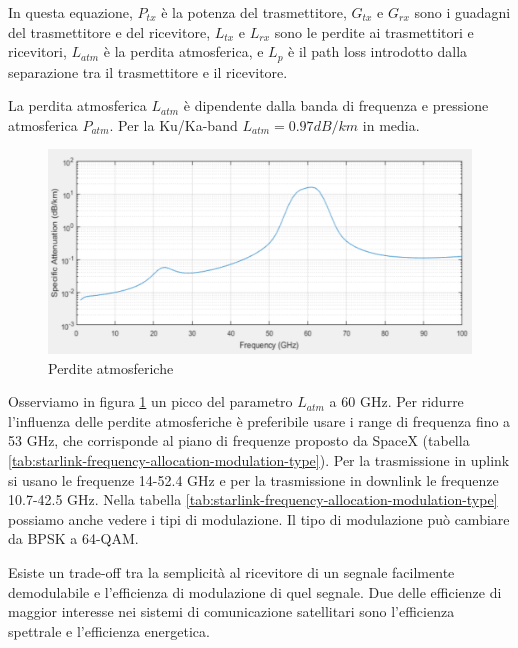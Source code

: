 In questa equazione, $P_{tx}$ è la potenza del trasmettitore, $G_{tx}$ e $G_{rx}$ sono i guadagni del trasmettitore e del ricevitore, $L_{tx}$ e $L_{rx}$ sono le perdite ai trasmettitori e ricevitori, $L_{atm}$ è la perdita atmosferica, e $L_{p}$ è il path loss introdotto dalla separazione tra il trasmettitore e il ricevitore.

La perdita atmosferica $L_{atm}$ è dipendente dalla banda di frequenza e pressione atmosferica $P_{atm}$.
Per la Ku/Ka-band $L_{atm} = 0.97 dB/km$ in media.

\begin{figure}[htbp]
  \centering
  \includegraphics[width=0.8\linewidth]{./res/img/atmospheric_losses_simulation.png}
  \caption{Perdite atmosferiche}
  \label{fig:atmospheric-losses-simulation}
\end{figure}

Osserviamo in figura \ref{fig:atmospheric-losses-simulation} un picco del parametro $L_{atm}$ a 60 GHz.
Per ridurre l'influenza delle perdite atmosferiche è preferibile usare i range di frequenza fino a 53 GHz, che corrisponde al piano di frequenze proposto da SpaceX (tabella \ref{tab:starlink-frequency-allocation-modulation-type}).
Per la trasmissione in uplink si usano le frequenze 14-52.4 GHz e per la trasmissione in downlink le frequenze 10.7-42.5 GHz.
Nella tabella \ref{tab:starlink-frequency-allocation-modulation-type} possiamo anche vedere i tipi di modulazione.
Il tipo di modulazione può cambiare da \ac{BPSK} a 64-\ac{QAM}.

Esiste un trade-off tra la semplicità al ricevitore di un segnale facilmente demodulabile e l'efficienza di modulazione di quel segnale.
Due delle efficienze di maggior interesse nei sistemi di comunicazione satellitari sono l'efficienza spettrale e l'efficienza energetica.

